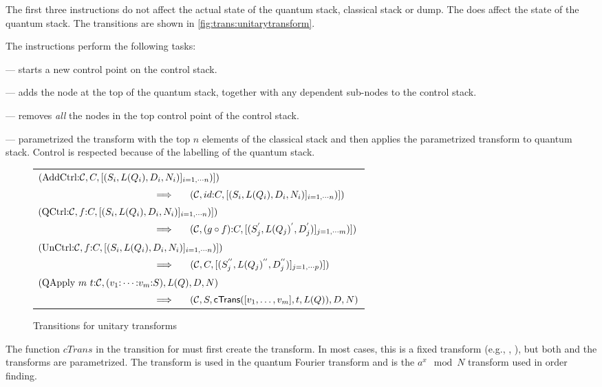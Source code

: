 The first three instructions do not affect the actual state
of the quantum stack, classical stack or dump.
The  does affect the state of the quantum stack.
The transitions  are
shown in \vref{fig:trans:unitarytransform}.

 The instructions perform
the following tasks:
\begin{description}
\item{} --- starts a new control point on the control stack.
\item{} --- adds the node at the top of the 
quantum stack, together
with any dependent sub-nodes to the control stack.
\item{} --- removes \emph{all} the nodes in the top control
point of the control stack.
\item{} --- parametrized the transform 
 with the top $n$ elements of the classical stack and
then applies the parametrized transform to quantum stack. Control is respected
because of the labelling of the quantum stack.
\end{description}

\begin{figure}[htbp]
\begin{tabular}{l}
$(\mathrm{AddCtrl}{:}\mathcal{C},C,[(S_i,L(Q_i),D_i,N_i)]_{i=1,\cdots n})]) $ \\
$\qquad\qquad\qquad\qquad\qquad\qquad\implies\ \quad (\mathcal{C},id{:}C,[(S_i,L(Q_i),D_i,N_i)]_{i=1,\cdots n})])$\\[12pt]

$(\mathrm{QCtrl}{:}\mathcal{C},f{:}C,[(S_i,L(Q_i),D_i,N_i)]_{i=1,\cdots n})]) $ \\
$\qquad\qquad\qquad\qquad\qquad\qquad\implies\ \quad (\mathcal{C},(g\circ f){:}C,[(S^{'}_j,L(Q_j)^{'},D^{'}_j)]_{j=1,\cdots m})])$\\[12pt] 
$(\mathrm{UnCtrl}{:}\mathcal{C}, f{:}C,[(S_i,L(Q_i),D_i,N_i)]_{i=1,\cdots n})]) $ \\
$\qquad\qquad\qquad\qquad\qquad\qquad\implies\ \quad (\mathcal{C},C,[(S^{''}_j,L(Q_j)^{''},D^{''}_j)]_{j=1,\cdots p})])$\\[12pt]
$(\mathrm{QApply}\ m\ t{:}\mathcal{C}, (v_1{:}\cdots {:}v_m{:}S),L(Q),D,N)  $ \\
$\qquad\qquad\qquad\qquad\qquad\qquad\implies\ \quad (\mathcal{C},S,
           \mathrm{\textsf{cTrans}}([v_1,\ldots,v_m],t,L(Q)),D,N)$ 
\end{tabular}
\caption{Transitions for unitary transforms}\label{fig:trans:unitarytransform}
\end{figure}

The function $cTrans$ in the transition for  must first 
create the transform. In most cases, this is a fixed  transform (e.g., \nottr,
\Had), but both  and the 
 transforms are parametrized. 
The transform   is used in the quantum Fourier transform and 
 is the $a^x \mod N$ transform used in order finding.

